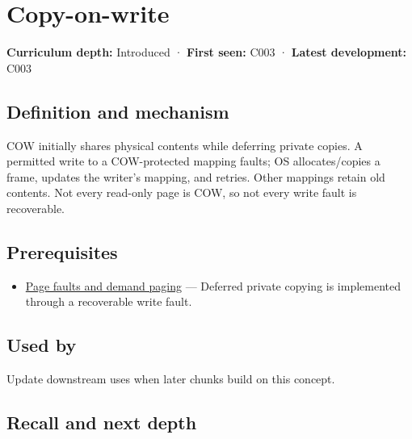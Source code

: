 \hypertarget{appendix-7a06e5baac04}{}\label{referencestart:appendix-7a06e5baac04}
\section{Copy-on-write}\label{appendix-7a06e5baac04-copy-on-write}

\textbf{Curriculum depth:} Introduced · \textbf{First seen:} C003 · \textbf{Latest development:} C003

\begin{allmightroledefinition}

\subsection{Definition and mechanism}\label{appendix-7a06e5baac04-definition-and-mechanism}

COW initially shares physical contents while deferring private copies. A permitted write to a COW-protected mapping faults; OS allocates/copies a frame, updates the writer's mapping, and retries. Other mappings retain old contents. Not every read-only page is COW, so not every write fault is recoverable.

\end{allmightroledefinition}

\subsection{Prerequisites}\label{appendix-7a06e5baac04-prerequisites}

\begin{itemize}
\tightlist
\item
  \hyperref[appendix-cc0909a7ef14]{Page faults and demand paging} --- Deferred private copying is implemented through a recoverable write fault.
\end{itemize}

\subsection{Used by}\label{appendix-7a06e5baac04-used-by}

Update downstream uses when later chunks build on this concept.

\subsection{Recall and next depth}\label{appendix-7a06e5baac04-recall-and-next-depth}

